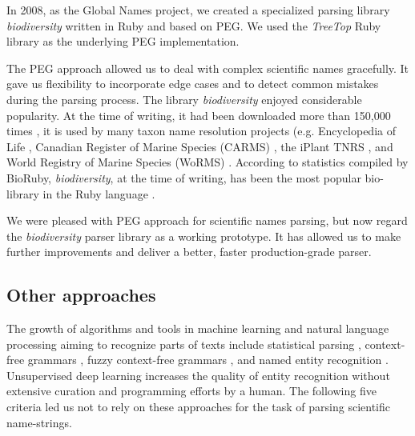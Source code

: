 \documentclass{bmcart}
\begin{document}
In 2008, as the Global Names project, we created a specialized parsing library \textit{biodiversity} \cite{biodiversity} written in Ruby and based on PEG\@. We used the \textit{TreeTop} Ruby library \cite{treetop} as the underlying PEG implementation.

The PEG approach allowed us to deal with complex scientific names gracefully.  It gave us flexibility to incorporate edge cases and to detect common mistakes during the parsing process. The library \textit{biodiversity} enjoyed considerable popularity. At the time of writing, it had been downloaded more than 150,000 times \cite{bdiv-downloads}, it is used by many taxon name resolution projects (e.g. Encyclopedia of Life \cite{eol}, Canadian Register of Marine Species (CARMS) \cite{carms}, the iPlant TNRS \cite{iplant}, and World Registry of Marine Species (WoRMS) \cite{worms}. According to statistics compiled by BioRuby, \textit{biodiversity}, at the time of writing, has been the most popular bio-library in the Ruby language \cite{biogems}.

We were pleased with PEG approach for scientific names parsing, but now regard the \textit{biodiversity} parser library as a working prototype. It has allowed us to make further improvements and deliver a better, faster production-grade parser.

\subsection*{Other approaches}


The  growth of algorithms and tools in machine learning and natural language processing aiming to recognize parts of texts include statistical parsing \cite{charniak1996statistical}, context-free grammars \cite{aho1972theory}, fuzzy context-free grammars \cite{asveld1995fuzzy}, and named entity recognition \cite{nadeau2007survey}. Unsupervised deep learning \cite{mikolov2013distributed, schmidhuber2015deep} increases the quality of entity recognition without extensive curation and programming efforts by a human. The following five criteria led us not to rely on these approaches for the task of parsing scientific name-strings.
\end{document}
